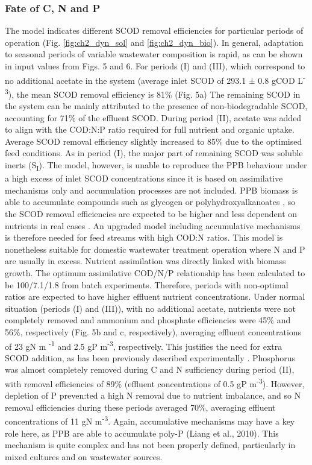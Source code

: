 \subsubsection{Fate of C, N and P}
The model indicates different SCOD removal efficiencies for particular periods of operation (Fig. \ref{fig:ch2_dyn_sol} and \ref{fig:ch2_dyn_bio}). In general, adaptation to seasonal periods of variable wastewater composition is rapid, as can be shown in input values from Figs. 5 and 6. For periods (I) and (III), which correspond to no additional acetate in the system (average inlet SCOD of 293.1 ± 0.8 gCOD L\textsuperscript{-3}), the mean SCOD removal efficiency is 81\% (Fig. 5a) The remaining SCOD in the system can be mainly attributed to the presence of non-biodegradable SCOD, accounting for 71\% of the effluent SCOD. During period (II), acetate was added to align with the COD:N:P ratio required for full nutrient and organic uptake. Average SCOD removal efficiency slightly increased to 85\% due to the optimised feed conditions. As in period (I), the major part of remaining SCOD was soluble inerts (S\textsubscript{I}). The model, however, is unable to reproduce the PPB behaviour under a high excess of inlet SCOD concentrations since it is based on assimilative mechanisms only and accumulation processes are not included. PPB biomass is able to accumulate compounds such as glycogen or polyhydroxyalkanoates \cite{Melnicki2009}, so the SCOD removal efficiencies are expected to be higher and less dependent on nutrients in real cases \cite{Hulsen2016,Hulsen2016a}. An upgraded model including accumulative mechanisms is therefore needed for feed streams with high COD:N ratios. This model is nonetheless suitable for domestic wastewater treatment operation where N and P are usually in excess. 
\skippingparagraph
Nutrient assimilation was directly linked with biomass growth. The optimum assimilative COD/N/P relationship has been calculated to be 100/7.1/1.8 from batch experiments. Therefore, periods with non-optimal ratios are expected to have higher effluent nutrient concentrations. Under normal situation (periods (I) and (III)), with no additional acetate, nutrients were not completely removed and ammonium and phosphate efficiencies were 45\% and 56\%, respectively (Fig. 5b and c, respectively), averaging effluent concentrations of 23 gN m \textsuperscript{-1} and 2.5 gP m\textsuperscript{-3}, respectively. This justifies the need for extra SCOD addition, as has been previously described experimentally \cite{Hulsen2016}. Phosphorus was almost completely removed during C and N sufficiency during period (II), with removal efficiencies of 89\% (effluent concentrations of 0.5 gP m\textsuperscript{-3}). However, depletion of P preven:ted a high N removal due to nutrient imbalance, and so N removal efficiencies during these periods averaged 70\%, averaging effluent concentrations of 11 gN m\textsuperscript{-3}. Again, accumulative mechanisms may have a key role here, as PPB are able to accumulate poly-P (Liang et al., 2010). This mechanism is quite complex and has not been properly defined, particularly in mixed cultures and on wastewater sources.
